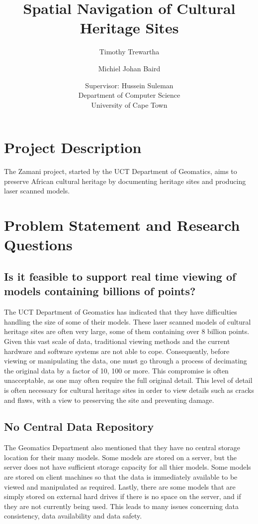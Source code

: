 \documentclass[12pt,a4paper]{article}
\begin{document}
\author{Timothy Trewartha \\
\and
Michiel Johan Baird \\
\and
Supervisor: Hussein Suleman \\
Department of Computer Science \\
University of Cape Town
 }
\title{Spatial Navigation of Cultural Heritage Sites}
\maketitle

\section{Project Description}
The Zamani project, started by the UCT Department of Geomatics, aims to preserve African cultural heritage by documenting heritage sites and producing laser scanned models.

\section{Problem Statement and Research Questions}
\subsection{Is it feasible to support real time viewing of models containing billions of points?}
The UCT Department of Geomatics has indicated that they have difficulties handling the size of some of their models. These laser scanned models of cultural heritage sites are often very large, some of them containing over 8 billion points. Given this vast scale of data, traditional viewing methods and the current hardware and software systems are not able to cope.  Consequently, before viewing or manipulating the data, one must go through a process of decimating the original data by a factor of 10, 100 or more. This compromise is often unacceptable, as one may often require the full original detail. This level of detail is often necessary for cultural heritage sites in order to view details such as cracks and flaws, with a view to preserving the site and preventing damage.
\subsection{No Central Data Repository}
The Geomatics Department also mentioned that they have no central storage location for their many models. Some models are stored on a server, but the server does not have sufficient storage capacity for all thier models. Some models are stored on client machines so that the data is immediately available to be viewed and manipulated as required. Lastly, there are some models that are simply stored on external hard drives if there is no space on the server, and if they are not currently being used. This leads to many issues concerning data consistency, data availability and data safety.
\end{document}
